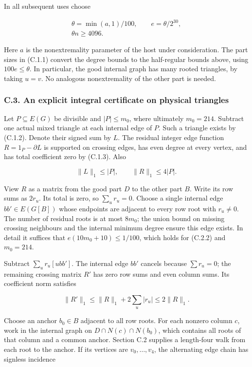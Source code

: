 \documentclass[english,11pt,a4paper]{article}
\newcounter{none}
\begin{document}
In all subsequent uses choose

\[\begin{gathered}
\theta=\min(a,1)/100,\qquad e=\theta/2^{30},\\
\theta n\ge4096.
\end{gathered}
\tag{C.2.2}\]

Here \(a\) is the nonextremality parameter of the host under consideration. The part sizes in (C.1.1) convert the degree bounds to the half-regular bounds above, using \(100e\le\theta\). In particular, the good internal graph has many rooted triangles, by taking \(u=v\). No analogous nonextremality of the other part is needed.

\subsubsection{C.3. An explicit integral certificate on physical triangles}\label{c.3.-an-explicit-integral-certificate-on-physical-triangles}

Let \(P\subseteq E(G)\) be divisible and \(|P|\le m_0\), where ultimately \(m_0=214\). Subtract one actual mixed triangle at each internal edge of \(P\). Such a triangle exists by (C.1.2). Denote their signed sum by \(L\). The residual integer edge function \(R=1_P-\partial L\) is supported on crossing edges, has even degree at every vertex, and has total coefficient zero by (C.1.3). Also

\[\|L\|_1\le |P|,\qquad\|R\|_1\le4|P|.
\tag{C.3.1}\]

View \(R\) as a matrix from the good part \(D\) to the other part \(B\). Write its row sums as \(2r_u\). Its total is zero, so \(\sum_u r_u=0\). Choose a single internal edge \(bb'\in E(G[B])\) whose endpoints are adjacent to every row root with \(r_u\ne0\). The number of residual roots is at most \(8m_0\); the union bound on missing crossing neighbours and the internal minimum degree ensure this edge exists. In detail it suffices that \(e(10m_0+10)\le1/100\), which holds for (C.2.2) and \(m_0=214\).

Subtract \(\sum_u r_u[ubb']\). The internal edge \(bb'\) cancels because \(\sum r_u=0\); the remaining crossing matrix \(R'\) has zero row sums and even column sums. Its coefficient norm satisfies

\[\|R'\|_1\le\|R\|_1+2\sum_u|r_u|\le2\|R\|_1.
\tag{C.3.2}\]

Choose an anchor \(b_0\in B\) adjacent to all row roots. For each nonzero column \(c\), work in the internal graph on \(D\cap N(c)\cap N(b_0)\), which contains all roots of that column and a common anchor. Section C.2 supplies a length-four walk from each root to the anchor. If its vertices are \(v_0,\ldots,v_4\), the alternating edge chain has signless incidence
\end{document}
